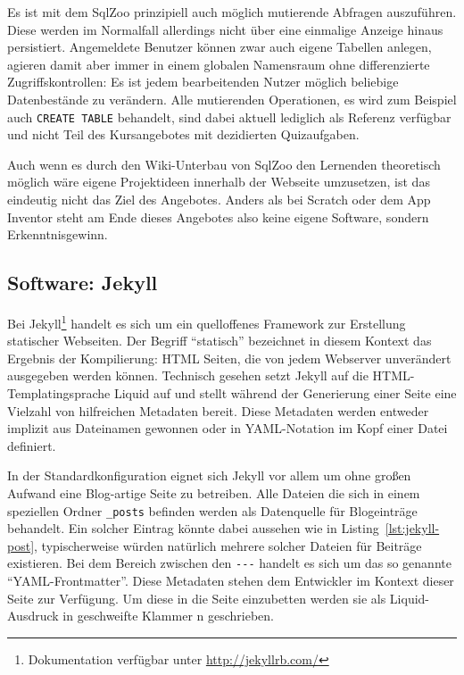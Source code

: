 Es ist mit dem SqlZoo prinzipiell auch möglich mutierende Abfragen auszuführen. Diese werden im Normalfall allerdings nicht über eine einmalige Anzeige hinaus persistiert. Angemeldete Benutzer können zwar auch eigene Tabellen anlegen, agieren damit aber immer in einem globalen Namensraum ohne differenzierte Zugriffskontrollen: Es ist jedem bearbeitenden Nutzer möglich beliebige Datenbestände zu verändern. Alle mutierenden Operationen, es wird zum Beispiel auch \lstinline{CREATE TABLE} behandelt, sind dabei aktuell lediglich als Referenz verfügbar und nicht Teil des Kursangebotes mit dezidierten Quizaufgaben.

Auch wenn es durch den Wiki-Unterbau von SqlZoo den Lernenden theoretisch möglich wäre eigene Projektideen innerhalb der Webseite umzusetzen, ist das eindeutig nicht das Ziel des Angebotes. Anders als bei Scratch oder dem App Inventor steht am Ende dieses Angebotes also keine eigene Software, sondern Erkenntnisgewinn.

\subsection{Software: Jekyll}
\label{sec:software-jekyll}
Bei Jekyll\footnote{Dokumentation verfügbar unter \url{http://jekyllrb.com/}} handelt es sich um ein quelloffenes Framework zur Erstellung statischer Webseiten. Der Begriff "`statisch"' bezeichnet in diesem Kontext das Ergebnis der Kompilierung: HTML Seiten, die von jedem Webserver unverändert ausgegeben werden können. Technisch gesehen setzt Jekyll auf die HTML-Templatingsprache Liquid auf und stellt während der Generierung einer Seite eine Vielzahl von hilfreichen Metadaten bereit. Diese Metadaten werden entweder implizit aus Dateinamen gewonnen oder in YAML-Notation im Kopf einer Datei definiert.

In der Standardkonfiguration eignet sich Jekyll vor allem um ohne großen Aufwand eine Blog-artige Seite zu betreiben. Alle Dateien die sich in einem speziellen Ordner \lstinline{_posts} befinden werden als Datenquelle für Blogeinträge behandelt. Ein solcher Eintrag könnte dabei aussehen wie in Listing~\ref{lst:jekyll-post}, typischerweise würden natürlich mehrere solcher Dateien für Beiträge existieren. Bei dem Bereich zwischen den \lstinline{---} handelt es sich um das so genannte "`YAML-Frontmatter"'. Diese Metadaten stehen dem Entwickler im Kontext dieser Seite zur Verfügung. Um diese in die Seite einzubetten werden sie als Liquid-Ausdruck in geschweifte Klammer
n geschrieben.

